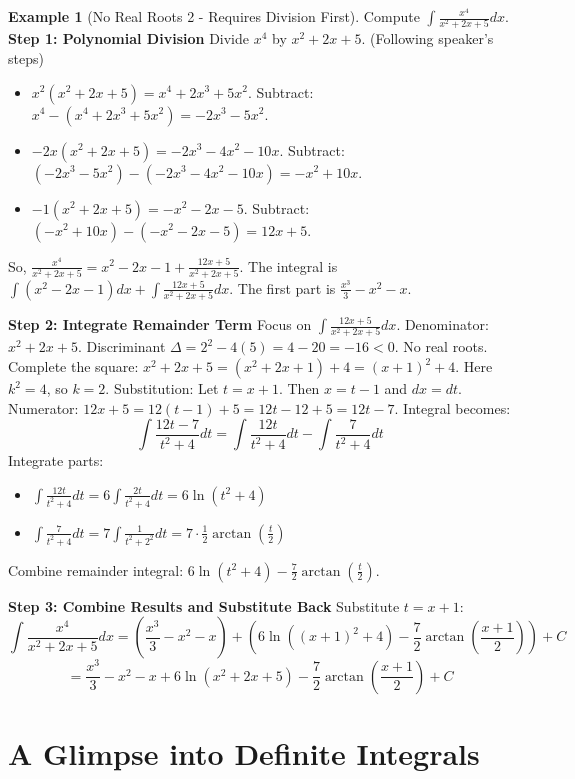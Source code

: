 \documentclass[11pt]{article}
\theoremstyle{plain}
\theoremstyle{definition}
\newtheorem{example}[theorem]{Example}
\theoremstyle{remark}
\begin{document}
\begin{example}[No Real Roots 2 - Requires Division First]
Compute $\int \frac{x^4}{x^2+2x+5} dx$.
\textbf{Step 1: Polynomial Division}
Divide $x^4$ by $x^2+2x+5$. (Following speaker's steps)
\begin{itemize}
    \item $x^2(x^2+2x+5) = x^4+2x^3+5x^2$. Subtract: $x^4 - (x^4+2x^3+5x^2) = -2x^3-5x^2$.
    \item $-2x(x^2+2x+5) = -2x^3-4x^2-10x$. Subtract: $(-2x^3-5x^2) - (-2x^3-4x^2-10x) = -x^2+10x$.
    \item $-1(x^2+2x+5) = -x^2-2x-5$. Subtract: $(-x^2+10x) - (-x^2-2x-5) = 12x+5$.
\end{itemize}
So, $\frac{x^4}{x^2+2x+5} = x^2-2x-1 + \frac{12x+5}{x^2+2x+5}$.
The integral is $\int (x^2-2x-1) dx + \int \frac{12x+5}{x^2+2x+5} dx$.
The first part is $\frac{x^3}{3} - x^2 - x$.

\textbf{Step 2: Integrate Remainder Term}
Focus on $\int \frac{12x+5}{x^2+2x+5} dx$.
Denominator: $x^2+2x+5$. Discriminant $\Delta = 2^2 - 4(5) = 4-20 = -16 < 0$. No real roots.
Complete the square: $x^2+2x+5 = (x^2+2x+1)+4 = (x+1)^2+4$. Here $k^2=4$, so $k=2$.
Substitution: Let $t=x+1$. Then $x=t-1$ and $dx=dt$.
Numerator: $12x+5 = 12(t-1)+5 = 12t-12+5 = 12t-7$.
Integral becomes:
\[ \int \frac{12t-7}{t^2+4} dt = \int \frac{12t}{t^2+4} dt - \int \frac{7}{t^2+4} dt \]
Integrate parts:
\begin{itemize}
    \item $\int \frac{12t}{t^2+4} dt = 6 \int \frac{2t}{t^2+4} dt = 6 \ln(t^2+4)$
    \item $\int \frac{7}{t^2+4} dt = 7 \int \frac{1}{t^2+2^2} dt = 7 \cdot \frac{1}{2} \arctan\left(\frac{t}{2}\right)$
\end{itemize}
Combine remainder integral: $6 \ln(t^2+4) - \frac{7}{2} \arctan\left(\frac{t}{2}\right)$.

\textbf{Step 3: Combine Results and Substitute Back}
Substitute $t=x+1$:
\[ \int \frac{x^4}{x^2+2x+5} dx = \left(\frac{x^3}{3} - x^2 - x\right) + \left(6 \ln((x+1)^2+4) - \frac{7}{2} \arctan\left(\frac{x+1}{2}\right)\right) + C \]
\[ = \frac{x^3}{3} - x^2 - x + 6 \ln(x^2+2x+5) - \frac{7}{2} \arctan\left(\frac{x+1}{2}\right) + C \]
\end{example}

\section{A Glimpse into Definite Integrals}
\end{document}
